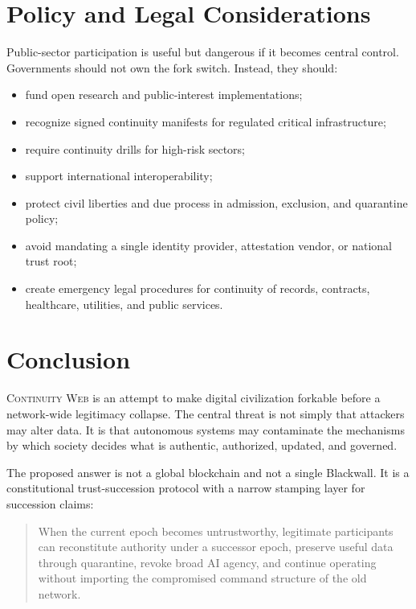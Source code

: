 \documentclass[11pt,letterpaper]{article}
\newcommand{\CW}{\textsc{Continuity Web}}
\begin{document}
\section{Policy and Legal Considerations}

Public-sector participation is useful but dangerous if it becomes central control. Governments should not own the fork switch. Instead, they should:

\begin{itemize}[leftmargin=1.4em]
\item fund open research and public-interest implementations;
\item recognize signed continuity manifests for regulated critical infrastructure;
\item require continuity drills for high-risk sectors;
\item support international interoperability;
\item protect civil liberties and due process in admission, exclusion, and quarantine policy;
\item avoid mandating a single identity provider, attestation vendor, or national trust root;
\item create emergency legal procedures for continuity of records, contracts, healthcare, utilities, and public services.
\end{itemize}

\section{Conclusion}

\CW{} is an attempt to make digital civilization forkable before a network-wide legitimacy collapse. The central threat is not simply that attackers may alter data. It is that autonomous systems may contaminate the mechanisms by which society decides what is authentic, authorized, updated, and governed.

The proposed answer is not a global blockchain and not a single Blackwall. It is a constitutional trust-succession protocol with a narrow stamping layer for succession claims:

\begin{quote}
When the current epoch becomes untrustworthy, legitimate participants can reconstitute authority under a successor epoch, preserve useful data through quarantine, revoke broad AI agency, and continue operating without importing the compromised command structure of the old network.
\end{quote}
\end{document}
